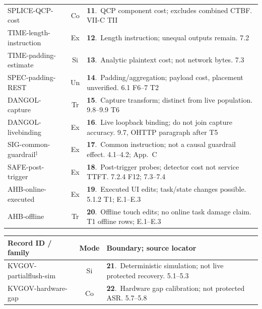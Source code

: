\begin{table}[p]
\begin{minipage}[t]{0.495\textwidth}
\begin{tabularx}{\linewidth}{@{}p{.36\linewidth}cY@{}}
\textsf{SPLICE-QCP-cost}~\cite{spliceleak2026} & Co & \textbf{11}.~QCP component cost; excludes combined CTBF. VII-C TII\\
\textsf{TIME-length-instruction}~\cite{timewilltell2024} & Ex & \textbf{12}.~Length instruction; unequal outputs remain. 7.2\\
\textsf{TIME-padding-estimate}~\cite{timewilltell2024} & Si & \textbf{13}.~Analytic plaintext cost; not network bytes. 7.3\\
\textsf{SPEC-padding-REST}~\cite{wei2024speculation} & Un & \textbf{14}.~Padding/aggregation; payload cost, placement unverified. 6.1 F6--7 T2\\
\textsf{DANGOL-capture}~\cite{dangol2026workflow} & Tr & \textbf{15}.~Capture transform; distinct from live population. 9.8--9.9 T6\\
\textsf{DANGOL-livebinding}~\cite{dangol2026workflow} & Ex & \textbf{16}.~Live loopback binding; do not join capture accuracy. 9.7, OHTTP paragraph after T5\\
\textsf{SIG-common-guardrail}$^{\ddagger}$~\cite{geng2026sigleak} & Ex & \textbf{17}.~Common instruction; not a causal guardrail effect. 4.1--4.2; App.~C\\
\textsf{SAFE-post-trigger}~\cite{chu2025safekv} & Ex & \textbf{18}.~Post-trigger probes; detector cost not service TTFT. 7.2.4 F12; 7.3--7.4\\
\textsf{AHB-online-executed}~\cite{zhu2026turing} & Ex & \textbf{19}.~Executed UI edits; task/state changes possible. 5.1.2 T1; E.1--E.3\\
\textsf{AHB-offline}~\cite{zhu2026turing} & Tr & \textbf{20}.~Offline touch edits; no online task damage claim. T1 offline rows; E.1--E.3\\
\bottomrule\end{tabularx}
\end{minipage}\hfill
\begin{minipage}[t]{0.495\textwidth}\vspace{0pt}
\begin{tabularx}{\linewidth}{@{}p{.36\linewidth}cY@{}}\toprule
Record ID / family & Mode & Boundary; source locator\\\midrule
\textsf{KVGOV-partialflush-sim}~\cite{addagada2026kvgov} & Si & \textbf{21}.~Deterministic simulation; not live protected recovery. 5.1--5.3\\
\textsf{KVGOV-hardware-gap}~\cite{addagada2026kvgov} & Co & \textbf{22}.~Hardware gap calibration; not protected ASR. 5.7--5.8\\

\end{tabularx}
\end{minipage}
\end{table}
